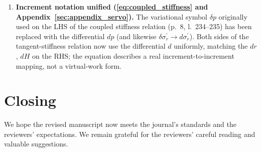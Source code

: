 \documentclass[11pt,a4paper]{article}
\newcommand{\manref}[1]{(#1)}                  %
\begin{document}
\begin{enumerate}[label=M\arabic*., leftmargin=*]
\item \textbf{Increment notation unified
      (\cref{eq:coupled_stiffness} and Appendix~\ref{sec:appendix_servo}).}
      The variational symbol $\delta p$ originally used on the LHS
      of the coupled stiffness relation \manref{p.~8, l.~234--235} has
      been replaced with the differential $dp$ (and likewise
      $\delta\sigma_r^{\prime}\to d\sigma_r^{\prime}$). Both sides of
      the tangent-stiffness relation now use the differential $d$
      uniformly, matching the $dr$, $dH$ on the RHS; the equation
      describes a real increment-to-increment mapping, not a
      virtual-work form.

\end{enumerate}

\clearpage

\section*{Closing}

We hope the revised manuscript now meets the journal's standards and the
reviewers' expectations. We remain grateful for the reviewers' careful
reading and valuable suggestions.



\end{document}
